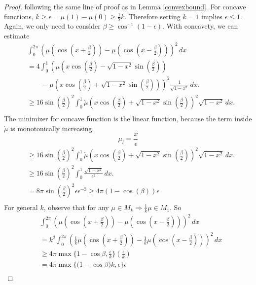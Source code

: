 \documentclass[twoside]{article} \usepackage{aistats2017}
\begin{document}
\begin{proof}
following the same line of proof as in Lemma \ref{convexbound}. For concave functions, $k\geq\epsilon=\mu(1)-\mu(0)\geq \frac{1}{2}k$. Therefore setting $k=1$ implies $\epsilon\leq 1$. Again, we only need to consider $\beta\geq \cos^{-1}(1-\epsilon)$.
With concavety, we can estimate
\begin{align*}
    &\int_{0}^{2\pi}\left(\mu(\cos(x+\frac{\beta}{2}))-\mu( \cos(x-\frac{\beta}{2}))\right)^2\, dx\\
     &=4\int_{0}^{1}\left(\mu(x\cos(\frac{\beta}{2})-\sqrt{1-x^2}\sin(\frac{\beta}{2}) )\right.\\
     &\left.\qquad-\mu(x\cos(\frac{\beta}{2})+\sqrt{1-x^2}\sin(\frac{\beta}{2}) )\right)^2\frac{1}{\sqrt{1-x^2}}\, dx.\\
     &\geq16\sin(\frac{\beta}{2})^2\int_{0}^{1}\dot{\mu}\left(x\cos(\frac{\beta}{2})+\sqrt{1-x^2}\sin(\frac{\beta}{2}) \right)^2\sqrt{1-x^2}\, dx.\\
\end{align*}
The minimizer for concave function is the linear function, because the term inside $\dot{\mu}$ is monotonically increasing.
$$\mu_l = \frac{x}{\epsilon}$$
\begin{align*}
    &\geq16\sin(\frac{\beta}{2})^2\int_{0}^{1}\dot{\mu}\left(x\cos(\frac{\beta}{2})+\sqrt{1-x^2}\sin(\frac{\beta}{2}) \right)^2\sqrt{1-x^2}\, dx.\\
    &\geq16\sin(\frac{\beta}{2})^2\int_{0}^{1}\frac{\sqrt{1-x^2}}{\epsilon^2}\, dx.\\
    &=8\pi\sin(\frac{\beta}{2})^2\epsilon\epsilon^{-3}\geq 4\pi(1-\cos(\beta))\epsilon\\
\end{align*}
 For general $k$, observe that for any $\mu\in M_k \Rightarrow \frac{1}{k}\mu\in M_1$. So
    \begin{align*}
 &\int_{0}^{2\pi}\left(\mu(\cos(x+\frac{\beta}{2}))-\mu( \cos(x-\frac{\beta}{2}))\right)^2\, dx\\
 &=k^2\int_{0}^{2\pi}\left(\frac{1}{k}\mu(\cos(x+\frac{\beta}{2}))-\frac{1}{k}\mu( \cos(x-\frac{\beta}{2}))\right)^2\, dx\\
 &\geq 4\pi \max\{1-\cos{\beta},\frac{\epsilon}{k}\}(\frac{\epsilon}{k})\\
& = 4\pi \max\{(1-\cos{\beta)k},\epsilon\}\epsilon\\
    \end{align*}
\end{proof}
\end{document}
